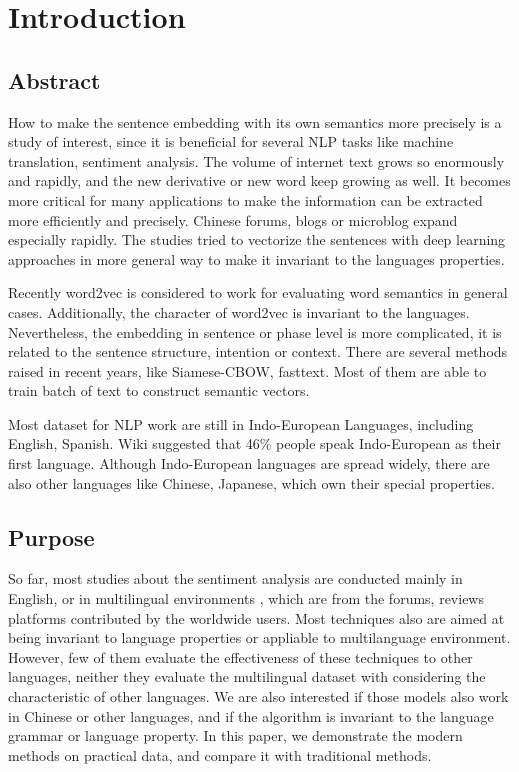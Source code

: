 \chapter{Introduction}
\setlength{\baselineskip}{1.5em}
\setlength{\parindent}{2em}
\setlength{\parskip}{1em}

\section{Abstract}

How to make the sentence embedding with its own semantics more precisely is a study of interest, since it is beneficial for several NLP tasks like machine translation, sentiment analysis. 
The volume of internet text grows so enormously and rapidly, and the new derivative or new word keep growing as well.
It becomes more critical for many applications to make the information can be extracted more efficiently and precisely.  
Chinese forums, blogs or microblog expand especially rapidly. The studies tried to vectorize the sentences with deep learning approaches in more general way to make it invariant to the languages properties.  


Recently word2vec\cite{word2vec} is considered to work for evaluating word semantics in general cases.  
Additionally, the character of word2vec is invariant to the languages. Nevertheless, 
the embedding in sentence or phase level is more complicated, it is related to the sentence structure,  
intention or context. There are several methods raised in recent years, like Siamese-CBOW, fasttext. 
Most of them are able to train batch of text to construct semantic vectors.

Most dataset for NLP work are still in Indo-European Languages, including English, Spanish. Wiki suggested that 46\% people speak Indo-European as their first language. 
Although Indo-European languages are spread widely, there are also other languages like Chinese, Japanese, which own their special properties.

\section{Purpose}

So far, most studies about the sentiment analysis are conducted mainly in English, or in multilingual environments
, which are from the forums, reviews platforms contributed by the worldwide users. Most techniques also are aimed at being invariant to language properties or appliable to multilanguage environment. 
However, few of them evaluate the effectiveness of these techniques to other languages, neither they evaluate the multilingual dataset with considering the characteristic of other languages.   
We are also interested if those models also work in Chinese or other languages, and if the algorithm is invariant to the language grammar or language property. 
In this paper, we demonstrate the modern methods on practical data, and compare it with traditional methods.